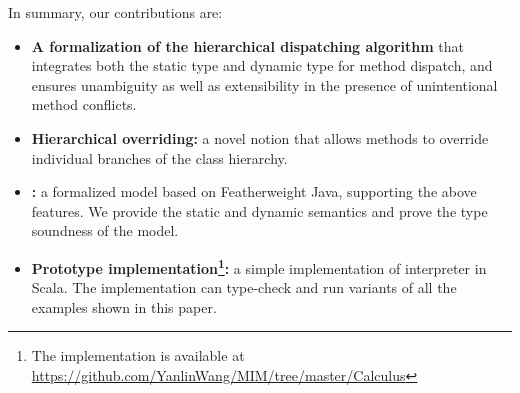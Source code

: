 In summary, our contributions are:
\begin{itemize}
	\item \textbf{A formalization of the hierarchical dispatching algorithm} that integrates both the static type and dynamic type for method dispatch, and 
	ensures unambiguity as well as extensibility in the presence
        of unintentional method conflicts.
	\item \textbf{Hierarchical overriding:} a novel notion that allows
          methods to override individual branches of the class hierarchy.
	\item \textbf{\name:} a formalized model based on
          Featherweight Java, supporting the above features. 
          We provide the static and dynamic semantics and prove the
          type soundness of the model.
	\item \textbf{Prototype implementation\footnote{The implementation is available at \url{https://github.com/YanlinWang/MIM/tree/master/Calculus}}:} a
          simple implementation of \MIM{} interpreter in Scala. The implementation can type-check and run variants
          of all the examples shown in this paper.
\end{itemize}

 